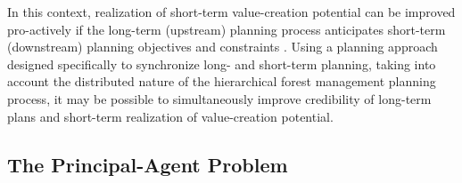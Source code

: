 
In this context, realization of short-term value-creation potential
can be improved pro-actively if the long-term (upstream) planning process
anticipates short-term (downstream) planning objectives and
constraints
\citep{beaudoin2008hierarchical}. Using a
planning approach designed specifically to synchronize long- and
short-term planning, taking into account the distributed nature of the
hierarchical forest management planning process, it may be possible to
simultaneously improve credibility of long-term plans and short-term
realization of value-creation potential. %


\subsection{The Principal-Agent Problem}


